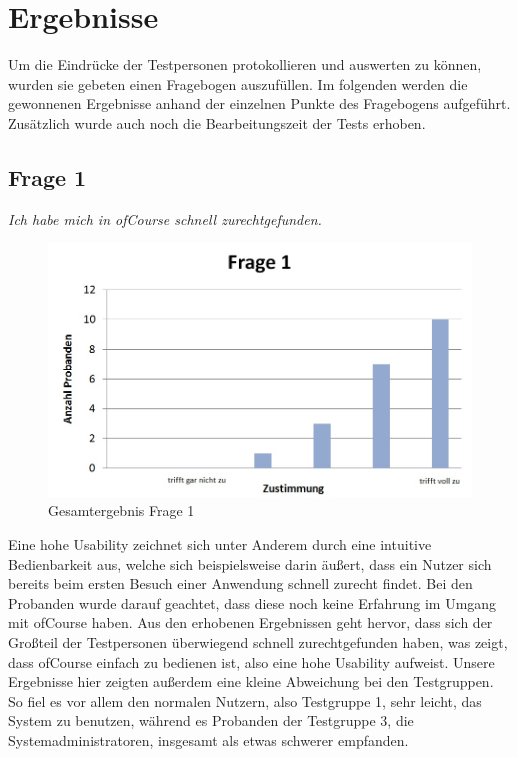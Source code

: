 \section{Ergebnisse}
Um die Eindrücke der Testpersonen protokollieren und auswerten zu können, wurden sie gebeten einen Fragebogen auszufüllen.
Im folgenden werden die gewonnenen Ergebnisse anhand der einzelnen Punkte des Fragebogens aufgeführt. Zusätzlich
wurde auch noch die Bearbeitungszeit der Tests erhoben.

\subsection{Frage 1}
\begin{center}
	{\it Ich habe mich in ofCourse schnell zurechtgefunden.}
\end{center}
\begin{figure}[h]
\centering
\includegraphics[width=0.7\linewidth]{img/Frage1}
\caption{Gesamtergebnis Frage 1}
\label{fig:Frage1}
\end{figure}
Eine hohe Usability zeichnet sich unter Anderem durch eine intuitive Bedienbarkeit aus, welche sich beispielsweise darin äußert, dass ein Nutzer sich bereits beim ersten Besuch einer Anwendung schnell zurecht findet. Bei den Probanden wurde darauf geachtet, dass diese noch keine Erfahrung im Umgang mit ofCourse haben. Aus den erhobenen Ergebnissen geht hervor, dass sich der Großteil der Testpersonen überwiegend schnell zurechtgefunden haben, was zeigt, dass ofCourse einfach zu bedienen ist, also eine hohe Usability aufweist. Unsere Ergebnisse hier zeigten außerdem eine kleine Abweichung bei den Testgruppen. So fiel es vor allem den normalen Nutzern, also Testgruppe 1, sehr leicht, das System zu benutzen, während es Probanden der Testgruppe 3, die Systemadministratoren, insgesamt als etwas schwerer empfanden.
\newpage
